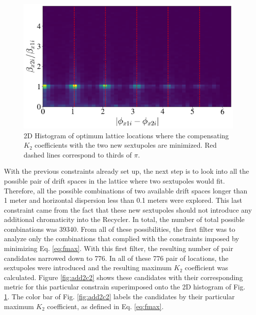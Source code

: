 \begin{figure}[H]
    \centering
    \includegraphics[width=\columnwidth]{chapter4/constrain1.png}
    \caption{2D Histogram of optimum lattice locations where the compensating $K_2$ coefficients with the two new sextupoles are minimized. Red dashed lines correspond to thirds of $\pi$.}
    \label{fig:add2c1}
\end{figure}

With the previous constraints already set up, the next step is to look into all the possible pair of drift spaces in the lattice where two sextupoles would fit. Therefore, all the possible combinations of two available drift spaces longer than 1 meter and horizontal dispersion less than 0.1 meters were explored. This last constraint came from the fact that these new sextupoles should not introduce any additional chromaticity into the Recycler. In total, the number of total possible combinations was 39340. From all of these possibilities, the first filter was to analyze only the combinations that complied with the constraints imposed by minimizing Eq. \ref{eq:fmax}. With this first filter, the resulting number of pair candidates narrowed down to 776. In all of these 776 pair of locations, the sextupoles were introduced and the resulting maximum $K_2$ coefficient was calculated. Figure \ref{fig:add2c2} shows these candidates with their corresponding metric for this particular constrain superimposed onto the 2D histogram of Fig. \ref{fig:add2c1}. The color bar of Fig. \ref{fig:add2c2} labels the candidates by their particular maximum $K_2$ coefficient, as defined in Eq. \ref{eq:fmax}.

